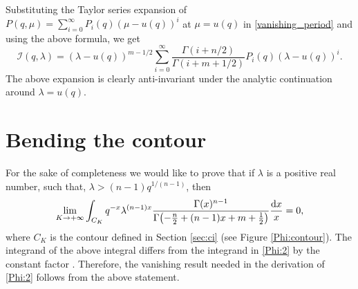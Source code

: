 \documentclass[pdftex]{sigma}
\numberwithin{equation}{section}
\newcommand{\I}{\mathcal{I}}
\begin{document}
Substituting the Taylor series expansion of
$P(q,\mu)=\sum_{i=0}^\infty P_i(q) (\mu-u(q))^i$ at $\mu=u(q)$
in \eqref{vanishing_period} and using the above formula, we get
\[
\I(q,\lambda) = (\lambda-u(q))^{m-1/2}
\sum_{i=0}^\infty
\frac{\Gamma(i+n/2)}{ \Gamma(i+m+1/2)} P_i(q)
(\lambda-u(q))^i.
\]
The above expansion is clearly anti-invariant under the analytic
continuation around $\lambda=u(q)$.

\appendix

\section{Bending the contour} \label{app:bc}
For the sake of completeness we would like to prove that if $\lambda$ is a positive real number, such that, $\lambda>(n-1) q^{1/(n-1)}$, then
\[
\lim_{K\to +\infty} \int_{C_K}
q^{-x}\lambda^{(n-1)x}
\frac{ \Gamma(x)^{n-1} }{
\Gamma\bigl(-\frac{n}{2}+(n-1)x+m+\frac{1}{2} \bigr) }
\frac{{\rm d}x}{x} =0,
\]
where $C_K$ is the contour defined in Section \ref{sec:ci} (see Figure \ref{Phi:contour}). The integrand of the above integral differs from the integrand in \eqref{Phi:2} by the constant factor . Therefore, the vanishing result needed in the derivation of \eqref{Phi:2} follows from the above statement.
\end{document}
